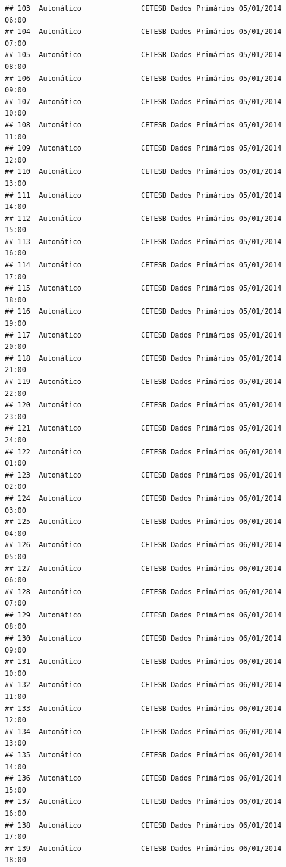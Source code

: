 \documentclass[]{book}
\begin{document}
\begin{verbatim}
## 103  Automático              CETESB Dados Primários 05/01/2014 06:00
## 104  Automático              CETESB Dados Primários 05/01/2014 07:00
## 105  Automático              CETESB Dados Primários 05/01/2014 08:00
## 106  Automático              CETESB Dados Primários 05/01/2014 09:00
## 107  Automático              CETESB Dados Primários 05/01/2014 10:00
## 108  Automático              CETESB Dados Primários 05/01/2014 11:00
## 109  Automático              CETESB Dados Primários 05/01/2014 12:00
## 110  Automático              CETESB Dados Primários 05/01/2014 13:00
## 111  Automático              CETESB Dados Primários 05/01/2014 14:00
## 112  Automático              CETESB Dados Primários 05/01/2014 15:00
## 113  Automático              CETESB Dados Primários 05/01/2014 16:00
## 114  Automático              CETESB Dados Primários 05/01/2014 17:00
## 115  Automático              CETESB Dados Primários 05/01/2014 18:00
## 116  Automático              CETESB Dados Primários 05/01/2014 19:00
## 117  Automático              CETESB Dados Primários 05/01/2014 20:00
## 118  Automático              CETESB Dados Primários 05/01/2014 21:00
## 119  Automático              CETESB Dados Primários 05/01/2014 22:00
## 120  Automático              CETESB Dados Primários 05/01/2014 23:00
## 121  Automático              CETESB Dados Primários 05/01/2014 24:00
## 122  Automático              CETESB Dados Primários 06/01/2014 01:00
## 123  Automático              CETESB Dados Primários 06/01/2014 02:00
## 124  Automático              CETESB Dados Primários 06/01/2014 03:00
## 125  Automático              CETESB Dados Primários 06/01/2014 04:00
## 126  Automático              CETESB Dados Primários 06/01/2014 05:00
## 127  Automático              CETESB Dados Primários 06/01/2014 06:00
## 128  Automático              CETESB Dados Primários 06/01/2014 07:00
## 129  Automático              CETESB Dados Primários 06/01/2014 08:00
## 130  Automático              CETESB Dados Primários 06/01/2014 09:00
## 131  Automático              CETESB Dados Primários 06/01/2014 10:00
## 132  Automático              CETESB Dados Primários 06/01/2014 11:00
## 133  Automático              CETESB Dados Primários 06/01/2014 12:00
## 134  Automático              CETESB Dados Primários 06/01/2014 13:00
## 135  Automático              CETESB Dados Primários 06/01/2014 14:00
## 136  Automático              CETESB Dados Primários 06/01/2014 15:00
## 137  Automático              CETESB Dados Primários 06/01/2014 16:00
## 138  Automático              CETESB Dados Primários 06/01/2014 17:00
## 139  Automático              CETESB Dados Primários 06/01/2014 18:00

\end{verbatim}
\end{document}
